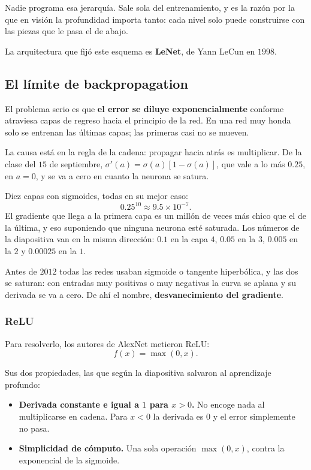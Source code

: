\documentclass[11pt,letterpaper]{article}
\begin{document}
Nadie programa esa jerarquía. Sale sola del entrenamiento, y es la
razón por la que en visión la profundidad importa tanto: cada nivel
solo puede construirse con las piezas que le pasa el de abajo.

La arquitectura que fijó este esquema es \textbf{LeNet}, de Yann LeCun
en $1998$.

\subsection*{El límite de backpropagation}

El problema serio es que \textbf{el error se diluye exponencialmente}
conforme atraviesa capas de regreso hacia el principio de la red. En
una red muy honda solo se entrenan las últimas capas; las primeras
casi no se mueven.

La causa está en la regla de la cadena: propagar hacia atrás es
multiplicar. De la clase del $15$ de septiembre,
$\sigma'(a) = \sigma(a)[1 - \sigma(a)]$, que vale a lo más $0.25$, en
$a = 0$, y se va a cero en cuanto la neurona se satura.

\begin{ejemplo}
  Diez capas con sigmoides, todas en su mejor caso:
  \[
    0.25^{10} \approx 9.5 \times 10^{-7} .
  \]
  El gradiente que llega a la primera capa es un millón de veces más
  chico que el de la última, y eso suponiendo que ninguna neurona esté
  saturada. Los números de la diapositiva van en la misma dirección:
  $0.1$ en la capa $4$, $0.05$ en la $3$, $0.005$ en la $2$ y
  $0.00025$ en la $1$.
\end{ejemplo}

Antes de $2012$ todas las redes usaban sigmoide o tangente
hiperbólica, y las dos se saturan: con entradas muy positivas o muy
negativas la curva se aplana y su derivada se va a cero. De ahí el
nombre, \textbf{desvanecimiento del gradiente}.

\subsubsection*{ReLU}

Para resolverlo, los autores de AlexNet metieron ReLU:
\[
    f(x) = \max(0, x) .
\]

Sus dos propiedades, las que según la diapositiva salvaron al
aprendizaje profundo:

\begin{itemize}[itemsep=0.25em]
  \item \textbf{Derivada constante e igual a $1$ para $x > 0$.} No
        encoge nada al multiplicarse en cadena. Para $x < 0$ la
        derivada es $0$ y el error simplemente no pasa.
  \item \textbf{Simplicidad de cómputo.} Una sola operación
        $\max(0,x)$, contra la exponencial de la sigmoide.
\end{itemize}
\end{document}
